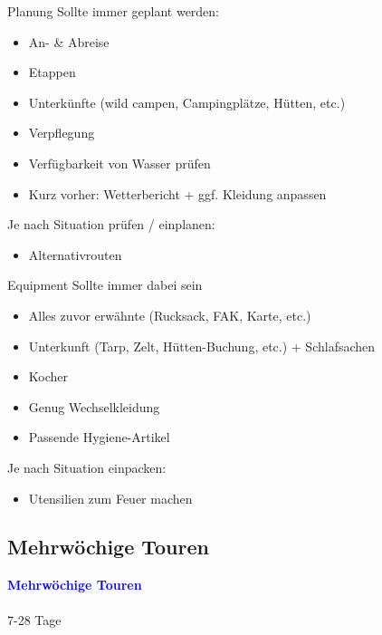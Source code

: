 \documentclass{beamer}
\begin{document}
			\begin{frame}{Planung}
				Sollte immer geplant werden:
				\begin{itemize}
					\item An- \& Abreise
					\item Etappen
					\item Unterkünfte (wild campen, Campingplätze, Hütten, etc.)
					\item Verpflegung
					\item Verfügbarkeit von Wasser prüfen
					\item Kurz vorher: Wetterbericht + ggf. Kleidung anpassen
				\end{itemize}
				Je nach Situation prüfen / einplanen:
				\begin{itemize}
					\item Alternativrouten
				\end{itemize}
			\end{frame}
			
			\begin{frame}{Equipment}
				Sollte immer dabei sein
				\begin{itemize}
					\item Alles zuvor erwähnte (Rucksack, FAK, Karte, etc.)
					\item Unterkunft (Tarp, Zelt, Hütten-Buchung, etc.) + Schlafsachen
					\item Kocher
					\item Genug Wechselkleidung
					\item Passende Hygiene-Artikel
				\end{itemize}
				Je nach Situation einpacken:
				\begin{itemize}
					\item Utensilien zum Feuer machen
				\end{itemize}
			\end{frame}
		
		\subsection{Mehrwöchige Touren}
		
			\begin{frame}
				\vspace{1cm}
				\begin{center}
					\textcolor{blue}{\textbf{Mehrwöchige Touren}}
					\\\,\\
					{\scriptsize 7-28 Tage}
				\end{center}
			\end{frame}
		
\end{document}
